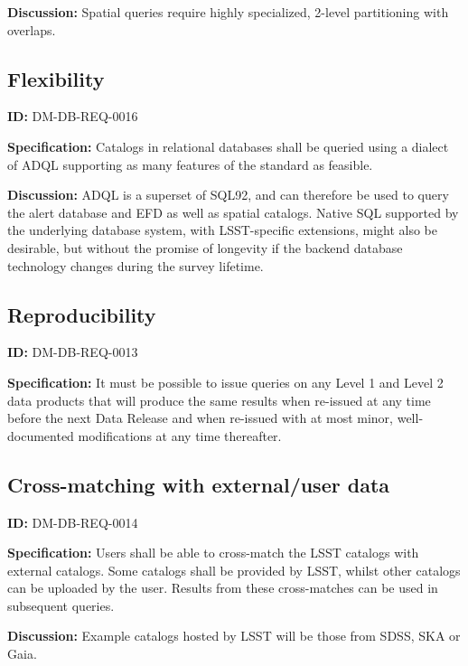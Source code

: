\documentclass[DM,toc]{lsstdoc}
\begin{document}
\textbf{Discussion:}
Spatial queries require highly specialized, 2-level partitioning with overlaps.

\subsection{Flexibility}

\label{DM-DB-REQ-0016}
\textbf{ID:} DM-DB-REQ-0016

\textbf{Specification:}
Catalogs in relational databases shall be queried using a dialect of ADQL supporting as many features of the standard as feasible.

\textbf{Discussion:}
ADQL is a superset of SQL92, and can therefore be used to query the alert database and EFD as well as spatial catalogs. Native SQL supported by the underlying database system, with LSST-specific extensions, might also be desirable, but without the promise of longevity if the backend database technology changes during the survey lifetime.

\subsection{Reproducibility}

\label{DM-DB-REQ-0013}
\textbf{ID:} DM-DB-REQ-0013

\textbf{Specification:}
It must be possible to issue queries on any Level 1 and Level 2 data products that will produce the same results when re-issued at any time before the next Data Release and when re-issued with at most minor, well-documented modifications at any time thereafter.

\subsection{Cross-matching with external/user data}

\label{DM-DB-REQ-0014}
\textbf{ID:} DM-DB-REQ-0014

\textbf{Specification:}
Users shall be able to cross-match the LSST catalogs with external catalogs. Some catalogs shall be provided by LSST, whilst other catalogs can be uploaded by the user. Results from these cross-matches can be used in subsequent queries.

\textbf{Discussion:}
Example catalogs hosted by LSST will be those from SDSS, SKA or Gaia.


\end{document}
